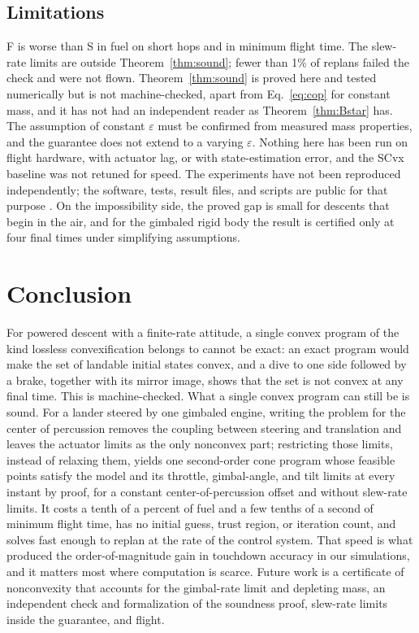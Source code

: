 \subsection{Limitations}
F is worse than S in fuel on short hops and in minimum flight time. The slew-rate limits are outside
Theorem~\ref{thm:sound}; fewer than 1\% of replans failed the check and were not flown. Theorem~\ref{thm:sound} is proved here
and tested numerically but is not machine-checked, apart from Eq.~\eqref{eq:cop} for constant mass, and it has not had an
independent reader as Theorem~\ref{thm:Bstar} has. The assumption of constant $\varepsilon$ must be confirmed from measured mass
properties, and the guarantee does not extend to a varying $\varepsilon$. Nothing here has been run on flight hardware, with actuator lag, or with state-estimation error, and the SCvx
baseline was not retuned for speed. The experiments have not been reproduced independently; the software, tests, result
files, and scripts are public for that purpose \cite{repo}. On the impossibility side, the proved gap is small for descents that begin in the air, and
for the gimbaled rigid body the result is certified only at four final times under simplifying assumptions.

\section{Conclusion}
For powered descent with a finite-rate attitude, a single convex program of the kind lossless convexification belongs to
cannot be exact: an exact program would make the set of landable initial states convex, and a dive to one side followed by a
brake, together with its mirror image, shows that the set is not convex at any final time. This is machine-checked. What a
single convex program can still be is sound. For a lander steered by one gimbaled engine, writing the problem for the center
of percussion removes the coupling between steering and translation and leaves the actuator limits as the only nonconvex
part; restricting those limits, instead of relaxing them, yields one second-order cone program whose feasible points
satisfy the model and its throttle, gimbal-angle, and tilt limits at every instant by proof, for a constant
center-of-percussion offset and without slew-rate limits. It costs a tenth of a percent of fuel and a few tenths of a second
of minimum flight time, has no initial guess, trust region, or iteration count, and solves fast enough to replan at the rate
of the control system. That speed is what produced the order-of-magnitude gain in touchdown accuracy in our simulations, and it matters
most where computation is scarce. Future work is a
certificate of nonconvexity that accounts for the gimbal-rate limit and depleting mass, an independent check and
formalization of the soundness proof, slew-rate limits inside the guarantee, and flight.

